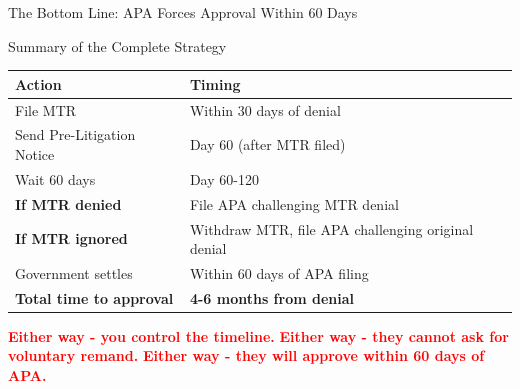 \documentclass[11pt]{beamer}
\begin{document}
	\begin{frame}{The Bottom Line: APA Forces Approval Within 60 Days}
		\scriptsize
		\begin{block}{Summary of the Complete Strategy}
			\centering
			\begin{tabular}{|p{5cm}|p{4cm}|}
				\hline
				\textbf{Action} & \textbf{Timing} \\
				\hline
				File MTR & Within 30 days of denial \\
				\hline
				Send Pre-Litigation Notice & Day 60 (after MTR filed) \\
				\hline
				Wait 60 days & Day 60-120 \\
				\hline
				\textbf{If MTR denied} & File APA challenging MTR denial \\
				\hline
				\textbf{If MTR ignored} & Withdraw MTR, file APA challenging original denial \\
				\hline
				Government settles & Within 60 days of APA filing \\
				\hline
				\textbf{Total time to approval} & \textbf{4-6 months from denial} \\
				\hline
			\end{tabular}
			\vspace{0.3cm}
			\textcolor{red}{\textbf{Either way - you control the timeline.}}
			\textcolor{red}{\textbf{Either way - they cannot ask for voluntary remand.}}
			\textcolor{red}{\textbf{Either way - they will approve within 60 days of APA.}}
		\end{block}
	\end{frame}
	
	
\end{document}
